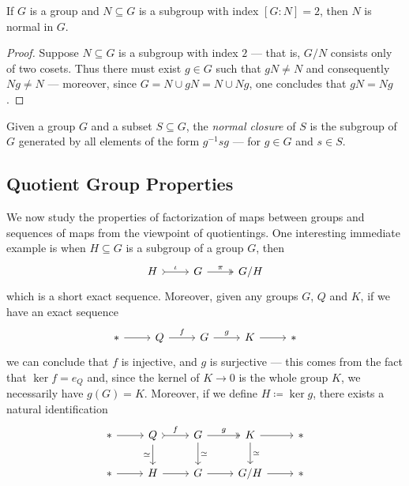 \begin{proposition}
\label{prop:index-2-is-normal}
If \(G\) is a group and \(N \subseteq G\) is a subgroup with index
\([G \colon N] = 2\), then \(N\) is normal in \(G\).
\end{proposition}

\begin{proof}
Suppose \(N \subseteq G\) is a subgroup with index \(2\) --- that is, \(G/N\)
consists only of two cosets. Thus there must exist \(g \in G\) such that
\(g N \neq N\) and consequently \(N g \neq N\) --- moreover, since
\(G = N \cup g N = N \cup N g\), one concludes that \(g N = N g\).
\end{proof}

\begin{definition}
\label{def:normal-closure}
Given a group \(G\) and a subset \(S \subseteq G\), the \emph{normal closure} of
\(S\) is the subgroup of \(G\) generated by all elements of the form \(g^{-1} s
g\) --- for \(g \in G\) and \(s \in S\).
\end{definition}


\subsection{Quotient Group Properties}

We now study the properties of factorization of maps between groups and
sequences of maps from the viewpoint of quotientings. One interesting immediate
example is when \(H \subseteq G\) is a subgroup of a group \(G\), then
\[
  \begin{tikzcd}
    H \ar[r, tail, "\iota"] &G \ar[r, two heads, "\pi"] &G/H
  \end{tikzcd}
\]
which is a short exact sequence. Moreover, given any groups \(G\), \(Q\) and
\(K\), if we have an exact sequence
\[
  \begin{tikzcd}
    * \ar[r] &Q \ar[r, "f"] &G \ar[r, "g"] &K \ar[r] &*
  \end{tikzcd}
\]
we can conclude that \(f\) is injective, and \(g\) is surjective --- this comes
from the fact that \(\ker f = e_Q\) and, since the kernel of \(K \to 0\) is the
whole group \(K\), we necessarily have \(g(G) = K\). Moreover, if we define \(H
\coloneq \ker g\), there exists a natural identification
\[
  \begin{tikzcd}
    * \ar[r]
    &Q \ar[d, swap, "\iso"] \ar[r, tail, "f"]
    &G \ar[r, two heads, "g"] \ar[d, "\iso"]
    &K \ar[r] \ar[d, "\iso"]
    &* \\
    * \ar[r] &H \ar[r] &G \ar[r] &G/H \ar[r] &* \\
  \end{tikzcd}
\]

